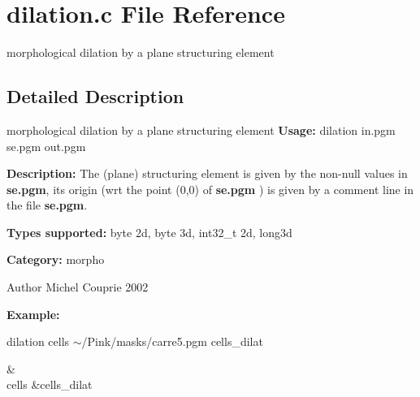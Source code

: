 \section{dilation.c File Reference}
\label{dilation_8c}


morphological dilation by a plane structuring element  




\subsection{Detailed Description}
morphological dilation by a plane structuring element {\bfseries Usage:} dilation in.pgm se.pgm out.pgm

{\bfseries Description:} The (plane) structuring element is given by the non-\/null values in {\bfseries se.pgm}, its origin (wrt the point (0,0) of {\bfseries se.pgm} ) is given by a comment line in the file {\bfseries se.pgm}.

{\bfseries Types supported:} byte 2d, byte 3d, int32\_\-t 2d, long3d

{\bfseries Category:} morpho

\begin{DoxyAuthor}{Author}
Michel Couprie 2002
\end{DoxyAuthor}
{\bfseries Example:}

dilation cells $\sim$/Pink/masks/carre5.pgm cells\_\-dilat

\begin{TabularC}{2}
\hline
 &  \\
cells &cells\_\-dilat  \\
\end{TabularC}
